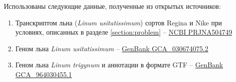 Использованы следующие данные, полученные из открытых источников:

\begin{enumerate}
    \item Транскриптом льна (\textit{Linum usitatissimum}) сортов Regina и Nike при условиях, описанных в разделе \ref{section:problem} -- \href{https://www.ncbi.nlm.nih.gov/sra/?term=PRJNA504749}{NCBI PRJNA504749}
    \item Геном льна \textit{Linum usitatissimum} -- \href{https://www.ncbi.nlm.nih.gov/datasets/genome/GCA_030674075.2/}{GenBank GCA\_030674075.2}
    \item Геном льна \textit{Linum trigynum} и аннотации в формате GTF -- \href{https://www.ncbi.nlm.nih.gov/datasets/genome/GCA_964030455.1/}{GenBank GCA\_964030455.1}
\end{enumerate}